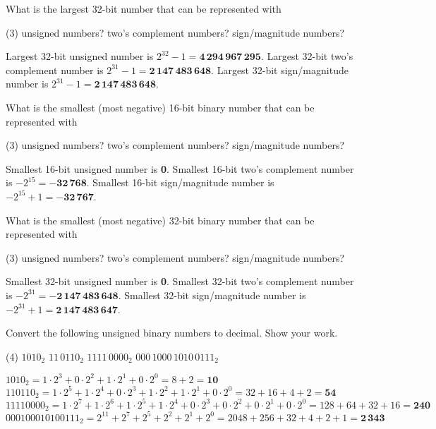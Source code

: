 \exercise
What is the largest 32-bit number that can be represented with 
\begin{tasks}(3)
	\task unsigned numbers?
	\task two's complement numbers?
	\task sign/magnitude numbers?
\end{tasks}
\solution
\begin{tasks}
	\task Largest 32-bit unsigned number is $2^{32}-1=\mathbf{4\,294\,967\,295}$.
	\task Largest 32-bit two's complement number is $2^{31}-1=\mathbf{2\,147\,483\,648}$.
	\task Largest 32-bit sign/magnitude number is $2^{31}-1=\mathbf{2\,147\,483\,648}$.
\end{tasks}

\exercise
What is the smallest (most negative) 16-bit binary number that can be
represented with
\begin{tasks}(3)
	\task unsigned numbers?
	\task two's complement numbers?
	\task sign/magnitude numbers?
\end{tasks}
\solution
\begin{tasks}
	\task Smallest 16-bit unsigned number is \textbf{0}.
	\task Smallest 16-bit two's complement number is $-2^{15}=\mathbf{-32\,768}$.
	\task Smallest 16-bit sign/magnitude number is $-2^{15}+1=\mathbf{-32\,767}$.
\end{tasks}

\exercise
What is the smallest (most negative) 32-bit binary number that can be
represented with 
\begin{tasks}(3)
	\task unsigned numbers?
	\task two's complement numbers?
	\task sign/magnitude numbers?
\end{tasks}
\solution
\begin{tasks}
	\task Smallest 32-bit unsigned number is \textbf{0}.
	\task Smallest 32-bit two's complement number is $-2^{31}=\mathbf{-2\,147\,483\,648}$.
	\task Smallest 32-bit sign/magnitude number is $-2^{31}+1=\mathbf{2\,147\,483\,647}$.
\end{tasks}

\exercise %
Convert the following unsigned binary numbers to decimal. Show your work.
\begin{tasks}(4)
	\task $1010_2$
	\task $11\,0110_2$
	\task $1111\,0000_2$
	\task $000\,1000\,1010\,0111_2$
\end{tasks}
\solution
\begin{tasks}
	\task $1010_2=1 \cdot 2^3 + 0 \cdot 2^2 + 1 \cdot 2^1 + 0 \cdot 2^0 
	= 8 + 2 = \mathbf{10}$
	\task $110110_2 = 1 \cdot 2^5 + 1 \cdot 2^4 + 0 \cdot 2^3 + 1 \cdot 2^2
	+ 1 \cdot 2^1 + 0 \cdot 2^0 = 32+ 16 + 4 + 2 = \mathbf{54}$
	\task $11110000_2 = 1 \cdot 2^7 + 1 \cdot 2^6 + 1 \cdot 2^5 + 1 \cdot 2^4
	+ 0 \cdot 2^3 + 0 \cdot 2^2 + 0 \cdot 2^1 + 0 \cdot 2^0 = 128+64+32+16
	= \mathbf{240}$
	\task $000100010100111_2 = 2^11 + 2^7 + 2^5 + 2^2 + 2^1 + 2^0
	= 2048 + 256 + 32 + 4 + 2 + 1 = \mathbf{2\,343}$
\end{tasks}

